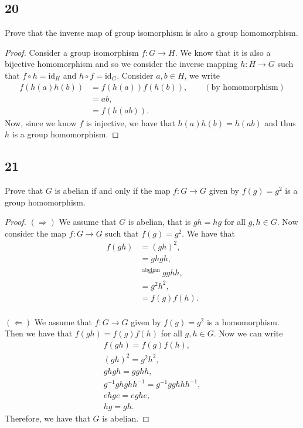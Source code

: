 \documentclass{article}
\newenvironment{hwproof}[1]
{
    #1
    \begin{proof}
}{
    \end{proof}
}
\begin{document}
\subsection*{20}
\begin{hwproof}
    {
        Prove that the inverse map of group isomorphism is also a group
        homomorphism.
    }
    Consider a group isomorphism $f: G \to H$. We know that it is also a
    bijective homomorphism and so we consider the inverse mapping
    $h: H \to G$ such that $f\circ h = \text{id}_H$ and
    $h\circ f = \text{id}_G$. Consider $a,b \in H$, we write
    \begin{align*}
        f(h(a)h(b)) & = f(h(a))f(h(b)), \qquad (\text{by homomorphism}) \\
                    & = ab,                                             \\
                    & = f(h(ab)).
    \end{align*}
    Now, since we know $f$ is injective, we have that $h(a)h(b) = h(ab)$ and thus
    $h$ is a group homomorphism.
\end{hwproof}

\subsection*{21}
\begin{hwproof}
    {
        Prove that $G$ is abelian if and only if the map $f: G \to G$ given by
        $f(g) = g^2$ is a group homomorphism.
    }
    $(\Rightarrow)$ We assume that $G$ is abelian, that is $gh = hg$ for all
    $g,h \in G$. Now consider the map $f: G \to G$ such that $f(g) = g^2$. We
    have that
    \begin{align*}
        f(gh) & = (gh)^2,                          \\
              & = ghgh,                            \\
              & \stackrel{\text{abelian}}{=} gghh, \\
              & = g^2h^2,                          \\
              & = f(g)f(h).                        \\
    \end{align*}

    $(\Leftarrow)$ We assume that $f: G \to G$ given by $f(g) = g^2$ is a
    homomorphism. Then we have that $f(gh) = f(g)f(h)$ for all $g,h \in G$.
    Now we can write
    \begin{gather*}
        f(gh) = f(g)f(h),\\
        (gh)^2 = g^2h^2,\\
        ghgh = gghh,\\
        g^{-1}ghghh^{-1} = g^{-1}gghhh^{-1},\\
        ehge = eghe,\\
        hg = gh.
    \end{gather*}
    Therefore, we have that $G$ is abelian.

\end{hwproof}
\end{document}
